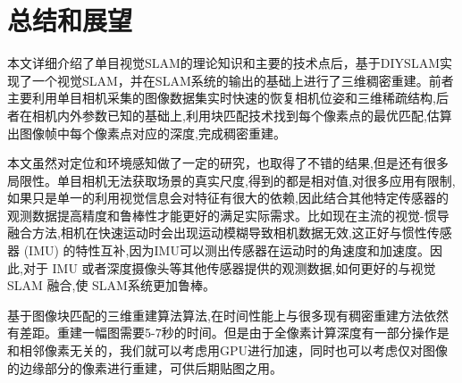 \chapter{总结和展望}
本文详细介绍了单目视觉SLAM的理论知识和主要的技术点后，基于DIYSLAM实现了一个视觉SLAM，并在SLAM系统的输出的基础上进行了三维稠密重建。前者主要利用单目相机采集的图像数据集实时快速的恢复相机位姿和三维稀疏结构,后者在相机内外参数已知的基础上,利用块匹配技术找到每个像素点的最优匹配,估算出图像帧中每个像素点对应的深度,完成稠密重建。\par
本文虽然对定位和环境感知做了一定的研究，也取得了不错的结果,但是还有很多局限性。单目相机无法获取场景的真实尺度,得到的都是相对值,对很多应用有限制,如果只是单一的利用视觉信息会对特征有很大的依赖,因此结合其他特定传感器的观测数据提高精度和鲁棒性才能更好的满足实际需求。比如现在主流的视觉-惯导融合方法,相机在快速运动时会出现运动模糊导致相机数据无效,这正好与惯性传感器 (IMU) 的特性互补,因为IMU可以测出传感器在运动时的角速度和加速度。因此,对于 IMU 或者深度摄像头等其他传感器提供的观测数据,如何更好的与视觉 SLAM 融合,使 SLAM系统更加鲁棒。\par
基于图像块匹配的三维重建算法算法,在时间性能上与很多现有稠密重建方法依然有差距。重建一幅图需要5-7秒的时间。但是由于全像素计算深度有一部分操作是和相邻像素无关的，我们就可以考虑用GPU进行加速，同时也可以考虑仅对图像的边缘部分的像素进行重建，可供后期贴图之用。